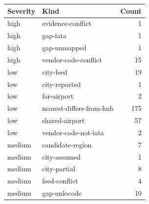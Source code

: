\begin{tabular}{llr}
\toprule
Severity & Kind & Count \\
\midrule
high & evidence-conflict & 1 \\
high & gap-iata & 1 \\
high & gap-unmapped & 1 \\
high & vendor-code-conflict & 15 \\
low & city-feed & 19 \\
low & city-reported & 1 \\
low & far-airport & 2 \\
low & nearest-differs-from-hub & 175 \\
low & shared-airport & 57 \\
low & vendor-code-not-iata & 2 \\
medium & candidate-region & 7 \\
medium & city-assumed & 1 \\
medium & city-partial & 8 \\
medium & feed-conflict & 4 \\
medium & gap-unlocode & 10 \\
\bottomrule
\end{tabular}
